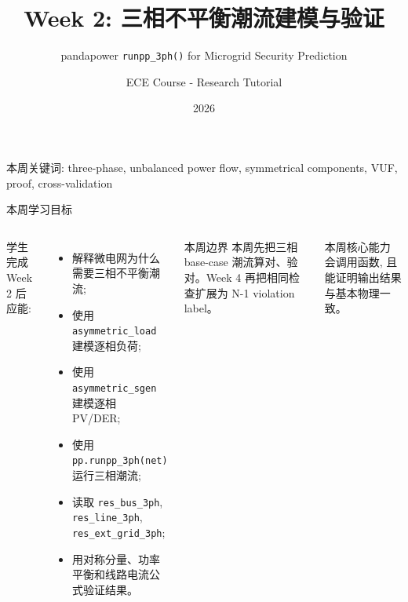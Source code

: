 \documentclass[aspectratio=169,10pt]{ctexbeamer}
\title[Week 2: Three-phase pandapower]{Week 2: 三相不平衡潮流建模与验证}
\subtitle{pandapower \texttt{runpp\_3ph()} for Microgrid Security Prediction}
\author{ECE Course - Research Tutorial}
\institute{Microgrid 3-phase Security AI Project}
\date{2026}
\newcommand{\code}[1]{\texttt{#1}}
\begin{document}
\begin{frame}
  \titlepage
  \vspace{-0.8em}
  \begin{center}
    \small 本周关键词: three-phase, unbalanced power flow, symmetrical components, VUF, proof, cross-validation
  \end{center}
\end{frame}

\begin{frame}{本周学习目标}
\begin{columns}[T]
学生完成 Week 2 后应能:
\begin{itemize}
  \item 解释微电网为什么需要三相不平衡潮流;
  \item 使用 \code{asymmetric\_load} 建模逐相负荷;
  \item 使用 \code{asymmetric\_sgen} 建模逐相 PV/DER;
  \item 使用 \code{pp.runpp\_3ph(net)} 运行三相潮流;
  \item 读取 \code{res\_bus\_3ph}, \code{res\_line\_3ph}, \code{res\_ext\_grid\_3ph};
  \item 用对称分量、功率平衡和线路电流公式验证结果。
\end{itemize}
\begin{block}{本周边界}
本周先把三相 base-case 潮流算对、验对。Week 4 再把相同检查扩展为 N-1 violation label。
\end{block}
\begin{alertblock}{本周核心能力}
会调用函数, 且能证明输出结果与基本物理一致。
\end{alertblock}
\end{columns}
\end{frame}
\end{document}
